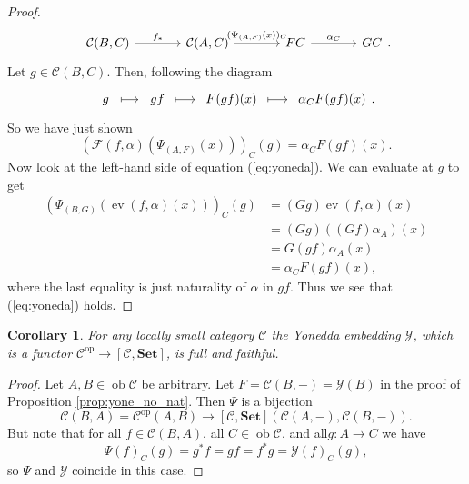 \documentclass{report}
\newcommand{\mbold}[1]{\mathrm{\mathbf{#1}}}
\DeclareMathOperator{\ev}{ev}
\DeclareMathOperator{\ob}{ob}
\theoremstyle{definition}
\theoremstyle{plain}
\newtheorem{coro}[thm]{Corollary}
\theoremstyle{definition}
\begin{document}
\begin{proof}
			\[\begin{tikzcd}[column sep=large]
				{\mathcal{C}(B,C)} & {\mathcal{C}(A,C)} & FC & GC
				\arrow["{f_*}", from=1-1, to=1-2]
				\arrow["{(\Psi_{(A,F)}(x))_C}", from=1-2, to=1-3]
				\arrow["{\alpha_C}", from=1-3, to=1-4]
			\end{tikzcd}.\]
			Let $g\in\mathcal{C}(B,C)$. Then, following the diagram
			\[\begin{tikzcd}
				g & gf & {F(gf)(x)} & {\alpha_C F(gf)(x)}
				\arrow[shorten <=5pt, shorten >=5pt, maps to, from=1-1, to=1-2]
				\arrow[shorten <=4pt, shorten >=4pt, maps to, from=1-2, to=1-3]
				\arrow[shorten <=4pt, shorten >=4pt, maps to, from=1-3, to=1-4]
			\end{tikzcd}.\]
			So we have just shown
			\[
				(\mathscr{F}(f,\alpha) (\Psi_{(A,F)} (x)))_C(g) = \alpha_C F(gf)(x).
			\]
			Now look at the left-hand side of equation (\ref{eq:yoneda}). We can evaluate at $g$ to get
			\begin{align*}
				(\Psi_{(B,G)}(\ev(f,\alpha)(x)))_C (g) &= (Gg)\ev(f,\alpha)(x) \\
				&= (Gg)((Gf) \alpha_A)(x)\\
				&= G(gf)\alpha_A(x)\\
				&= \alpha_CF(gf)(x),
			\end{align*}
			where the last equality is just naturality of $\alpha$ in $gf$. Thus we see that (\ref{eq:yoneda}) holds.
		\end{proof}
		\begin{coro}\label{coro:yon_emb_ff}
			For any locally small category $\mathcal{C}$ the Yonedda embedding $\mathscr{Y}$, which is a functor $\mathcal{C}^{\text{op}} \to [\mathcal{C},\mbold{Set}]$, is full and faithful.
		\end{coro}
		\begin{proof}
			Let $A,B\in\ob\mathcal{C}$ be arbitrary. Let $F = \mathcal{C}(B,-) = \mathscr{Y}(B)$ in the proof of Proposition \ref{prop:yone_no_nat}. Then $\Psi$ is a bijection
			\[
			\mathcal{C}(B,A) = \mathcal{C}^{\text{op}}(A,B) \to [\mathcal{C},\mbold{Set}](\mathcal{C}(A,-), \mathcal{C}(B,-)).
			\]
			But note that for all $f\in\mathcal{C}(B,A)$, all $C\in\ob\mathcal{C}$, and all$g\colon A \to C$ we have
			\[
				\Psi(f)_C(g) = g^*f = gf = f^*g = \mathscr{Y}(f)_C(g),
			\]
			so $\Psi$ and $\mathscr{Y}$ coincide in this case.
		\end{proof}
\end{document}
